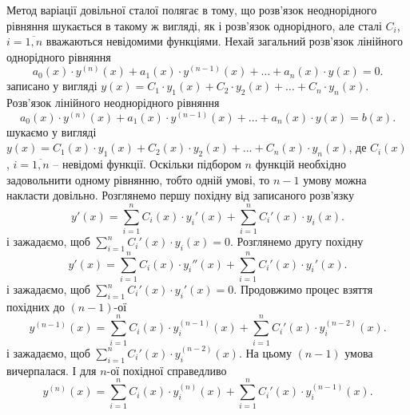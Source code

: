 Метод варіації довільної сталої полягає в тому, що розв’язок неоднорідного рівняння шукається в такому ж вигляді, як і розв’язок однорідного, але сталі $C_i$, $i = \overline{1, n}$ вважаються невідомими функціями. Нехай загальний розв’язок лінійного однорідного рівняння
\begin{equation}
	\label{eq:3.3.16}
	a_0(x) \cdot y^{(n)}(x) + a_1(x) \cdot y^{(n - 1)}(x) + \ldots + a_n(x) \cdot y(x) = 0.
\end{equation}
записано у вигляді $y(x) = C_1 \cdot y_1(x) + C_2 \cdot y_2(x) + \ldots + C_n \cdot y_n(x)$. \\

Розв’язок лінійного неоднорідного рівняння
\begin{equation}
	\label{eq:3.3.17}
	a_0(x) \cdot y^{(n)}(x) + a_1(x) \cdot y^{(n - 1)}(x) + \ldots + a_n(x) \cdot y(x) = b(x).
\end{equation}
шукаємо у вигляді $y(x) = C_1(x) \cdot y_1(x) + C_2(x) \cdot y_2(x) + \ldots + C_n(x) \cdot y_n(x)$, де $C_i(x)$, $i = \overline{1, n}$ -- невідомі функції. Оскільки підбором $n$ функцій необхідно задовольнити одному рівнянню, тобто одній умові, то $n - 1$ умову можна накласти довільно. Розглянемо першу похідну від записаного розв’язку
\begin{equation}
	\label{eq:3.3.18}
	y'(x) = \sum_{i = 1}^n C_i(x) \cdot y_i'(x) + \sum_{i = 1}^n C_i'(x) \cdot y_i(x).
\end{equation}
і зажадаємо, щоб $\sum_{i = 1}^n C_i'(x) \cdot y_i(x) = 0$. Розглянемо другу похідну
\begin{equation}
	\label{eq:3.3.19}
	y'(x) = \sum_{i = 1}^n C_i(x) \cdot y_i''(x) + \sum_{i = 1}^n C_i'(x) \cdot y_i'(x).
\end{equation}
і зажадаємо, щоб $\sum_{i = 1}^n C_i'(x) \cdot y_i'(x) = 0$. Продовжимо процес взяття похідних до $(n - 1)$-ої 
\begin{equation}
	\label{eq:3.3.20}
	y^{(n - 1)}(x) = \sum_{i = 1}^n C_i(x) \cdot y_i^{(n - 1)}(x) + \sum_{i = 1}^n C_i'(x) \cdot y_i^{(n - 2)}(x).
\end{equation}
і зажадаємо, щоб $\sum_{i = 1}^n C_i'(x) \cdot y_i^{(n - 2)}(x)$. На цьому $(n - 1)$ умова вичерпалася. І для $n$-ої похідної справедливо
\begin{equation}
	\label{eq:3.3.21}
	y^{(n)}(x) = \sum_{i = 1}^n C_i(x) \cdot y_i^{(n)}(x) + \sum_{i = 1}^n C_i'(x) \cdot y_i^{(n - 1)}(x).
\end{equation}

